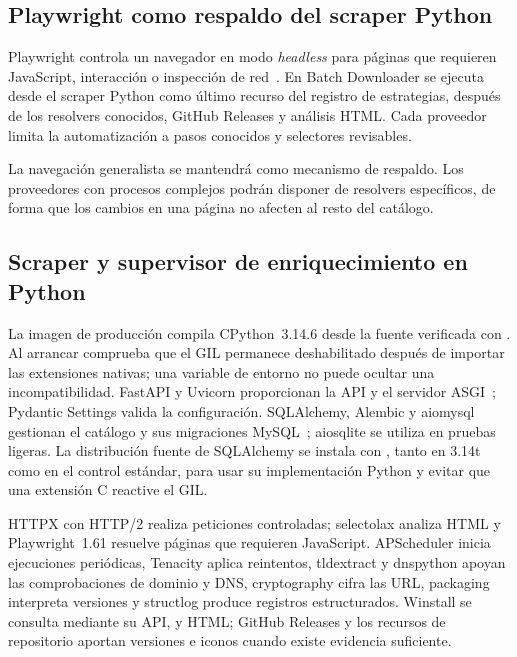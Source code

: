 \subsection{Playwright como respaldo del scraper Python}

Playwright controla un navegador en modo \emph{headless} para páginas que requieren JavaScript, interacción o inspección de red~\cite{playwright}. En Batch Downloader se ejecuta desde el scraper Python como último recurso del registro de estrategias, después de los resolvers conocidos, GitHub Releases y análisis HTML. Cada proveedor limita la automatización a pasos conocidos y selectores revisables.

La navegación generalista se mantendrá como mecanismo de respaldo. Los proveedores con procesos complejos podrán disponer de resolvers específicos, de forma que los cambios en una página no afecten al resto del catálogo.

\subsection{Scraper y supervisor de enriquecimiento en Python}

La imagen de producción compila CPython~3.14.6 desde la fuente verificada con . Al arrancar comprueba que el GIL permanece deshabilitado después de importar las extensiones nativas; una variable de entorno no puede ocultar una incompatibilidad. FastAPI y Uvicorn proporcionan la API y el servidor ASGI~\cite{fastapi}; Pydantic Settings valida la configuración. SQLAlchemy, Alembic y aiomysql gestionan el catálogo y sus migraciones MySQL~\cite{sqlalchemy,alembic}; aiosqlite se utiliza en pruebas ligeras. La distribución fuente de SQLAlchemy se instala con , tanto en 3.14t como en el control estándar, para usar su implementación Python y evitar que una extensión C reactive el GIL.

HTTPX con HTTP/2 realiza peticiones controladas; selectolax analiza HTML y Playwright~1.61 resuelve páginas que requieren JavaScript. APScheduler inicia ejecuciones periódicas, Tenacity aplica reintentos, tldextract y dnspython apoyan las comprobaciones de dominio y DNS, cryptography cifra las URL, packaging interpreta versiones y structlog produce registros estructurados. Winstall se consulta mediante su API,  y HTML; GitHub Releases y los recursos de repositorio aportan versiones e iconos cuando existe evidencia suficiente.

